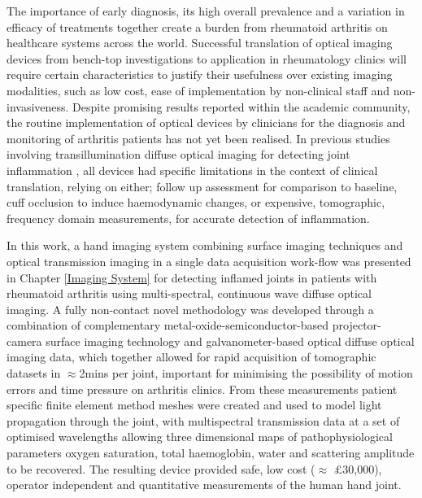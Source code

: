 \documentclass[twoside]{bhamthesis}
\theoremstyle{definition}
\begin{document}
The importance of early diagnosis, its high overall prevalence and a variation in efficacy of treatments together create a burden from rheumatoid arthritis on healthcare systems across the world. Successful translation of optical imaging devices from bench-top investigations to application in rheumatology clinics will require certain characteristics to justify their usefulness over existing imaging modalities, such as low cost, ease of implementation by non-clinical staff and non-invasiveness. Despite promising results reported within the academic community, the routine implementation of optical devices by clinicians for the diagnosis and monitoring of arthritis patients has not yet been realised. In previous studies involving transillumination diffuse optical imaging for detecting joint inflammation \cite{van2016assessment,hielscher2004sagittal,beuthan2002light,prapavat1995evaluation,prapavat1998evaluation,scheel2003laser}, all devices had specific limitations in the context of clinical translation, relying on either; follow up assessment for comparison to baseline, cuff occlusion to induce haemodynamic changes, or expensive, tomographic, frequency domain measurements, for accurate detection of inflammation.

In this work, a hand imaging system combining surface imaging techniques and optical transmission imaging in a single data acquisition work-flow was presented in Chapter \ref{Imaging System} for detecting inflamed joints in patients with rheumatoid arthritis using multi-spectral, continuous wave diffuse optical imaging. A fully non-contact novel methodology was developed through a combination of complementary metal-oxide-semiconductor-based projector-camera surface imaging technology and galvanometer-based optical diffuse optical imaging data, which together allowed for rapid acquisition of tomographic datasets in $\approx$2mins per joint, important for minimising the possibility of motion errors and time pressure on arthritis clinics. From these measurements patient specific finite element method meshes were created and used to model light propagation through the joint, with multispectral transmission data at a set of optimised wavelengths allowing three dimensional maps of pathophysiological parameters oxygen saturation, total haemoglobin, water and scattering amplitude to be recovered. The resulting device provided safe, low cost ($\approx$ $\pounds$30,000), operator independent and quantitative measurements of the human hand joint.
\end{document}
